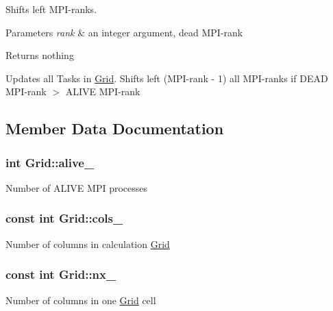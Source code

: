 Shifts left M\+P\+I-\/ranks. 


\begin{DoxyParams}{Parameters}
{\em rank} & an integer argument, dead M\+P\+I-\/rank \\
\hline
\end{DoxyParams}
\begin{DoxyReturn}{Returns}
nothing
\end{DoxyReturn}
Updates all Tasks in \hyperlink{classGrid}{Grid}. Shifts left (M\+P\+I-\/rank -\/ 1) all M\+P\+I-\/ranks if D\+E\+AD M\+P\+I-\/rank $>$ A\+L\+I\+VE M\+P\+I-\/rank 

\subsection{Member Data Documentation}
\subsubsection[{\texorpdfstring{alive\+\_\+}{alive_}}]{\setlength{\rightskip}{0pt plus 5cm}int Grid\+::alive\+\_\+\hspace{0.3cm}{\ttfamily [private]}}\hypertarget{classGrid_a878bac705a4a7e23d87bf74332a0c59a}{}\label{classGrid_a878bac705a4a7e23d87bf74332a0c59a}
Number of A\+L\+I\+VE M\+PI processes 
\subsubsection[{\texorpdfstring{cols\+\_\+}{cols_}}]{\setlength{\rightskip}{0pt plus 5cm}const int Grid\+::cols\+\_\+\hspace{0.3cm}{\ttfamily [private]}}\hypertarget{classGrid_a25c87f1b691be65760282b75fac9a487}{}\label{classGrid_a25c87f1b691be65760282b75fac9a487}
Number of columns in calculation \hyperlink{classGrid}{Grid} 
\subsubsection[{\texorpdfstring{nx\+\_\+}{nx_}}]{\setlength{\rightskip}{0pt plus 5cm}const int Grid\+::nx\+\_\+\hspace{0.3cm}{\ttfamily [private]}}\hypertarget{classGrid_af1915aaf156bbc0677d2f8853643fddb}{}\label{classGrid_af1915aaf156bbc0677d2f8853643fddb}
Number of columns in one \hyperlink{classGrid}{Grid} cell 
